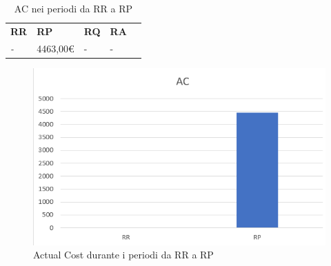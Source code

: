 \renewcommand{\arraystretch}{1.5}
\begin{longtable}{ C{3cm} C{3cm}  C{3cm}  C{3cm} c }
    \caption{ AC nei periodi da RR a RP} \\
    \rowcolor{\primaryColor}
    \textcolor{\secondaryColor}{
    \centering\textbf{RR}}     & \textcolor{\secondaryColor}{\centering\textbf{RP}}    & \textcolor{\secondaryColor}
    {\centering\textbf{RQ}} & \textcolor{\secondaryColor}{\centering\textbf{RA}}    \\
    \textit{-}           & 4463,00\euro                                  & - & - \\
\end{longtable}

\begin{figure}[H]
	\centering
	\includegraphics[scale=0.8]{src/ResocontoVerifica/src/img/AC.png}
	\caption{ Actual Cost durante i periodi da RR a RP}
\end{figure}

